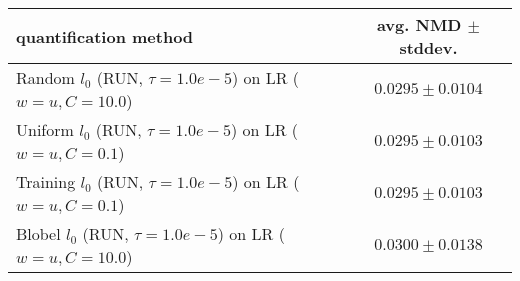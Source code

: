 \begin{tabular}{lc}
  \toprule
  quantification method & avg. NMD $\pm$ stddev. \\
  \midrule
  Random $l_0$ (RUN, $\tau=1.0e-5$) on LR ($w=u, C=10.0$) & $\mathbf{0.0295 \pm 0.0104}$ \\
  Uniform $l_0$ (RUN, $\tau=1.0e-5$) on LR ($w=u, C=0.1$) & $\mathbf{0.0295 \pm 0.0103}$ \\
  Training $l_0$ (RUN, $\tau=1.0e-5$) on LR ($w=u, C=0.1$) & $\mathbf{0.0295 \pm 0.0103}$ \\
  Blobel $l_0$ (RUN, $\tau=1.0e-5$) on LR ($w=u, C=10.0$) & $0.0300 \pm 0.0138$ \\
  \bottomrule
\end{tabular}
